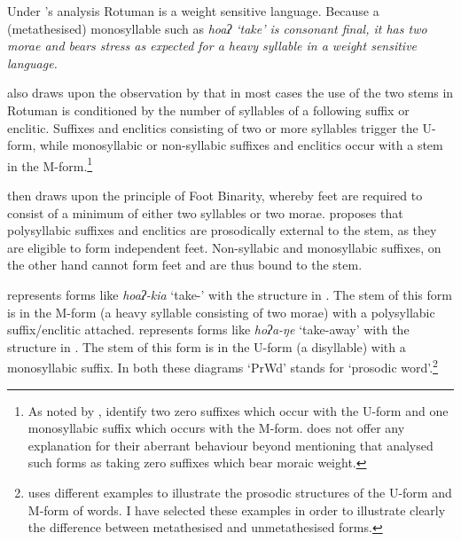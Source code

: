 Under \citeauthor{mcc00}'s analysis Rotuman is a weight sensitive language.
Because a (metathesised) monosyllable such as \it{hoaʔ} `take' is
consonant final, it has two morae and bears stress
as expected for a heavy syllable in a weight sensitive language.

\cite{mcc00} also draws upon the observation
by \cite{haki98} that in most cases the use of the two stems in Rotuman
is conditioned by the number of syllables of a following suffix or enclitic.
Suffixes and enclitics consisting of two or more syllables trigger the U-form,
while monosyllabic or non-syllabic suffixes and enclitics occur
with a stem in the M-form.\footnote{\label{fn:Problem2}
		As noted by \cite[162]{mcc00}, \citet{haki98} identify
		two zero suffixes which occur with the U-form
		and one monosyllabic suffix which occurs with the M-form.
		\cite{mcc00} does not offer any explanation for their
		aberrant behaviour beyond mentioning that \citet{haki98} analysed such
		forms as taking zero suffixes which bear moraic weight.}

\citet[156]{mcc00} then draws upon the principle of Foot Binarity,
whereby feet are required to consist of a minimum of either two syllables or two morae.
\citeauthor{mcc00} proposes that polysyllabic suffixes and enclitics
are prosodically external to the stem, as they are eligible to form independent feet.
Non-syllabic and monosyllabic suffixes, on the other hand cannot form feet and are thus bound to the stem.

\citet[163]{mcc00} represents forms like \emph{hoaʔ-kia}
`take-' with the structure in .
The stem of this form is in the M-form
(a heavy syllable consisting of two morae)
with a polysyllabic suffix/enclitic attached.
\citeauthor{mcc00} represents forms like \emph{hoʔa-ŋe} `take-away'
with the structure in .
The stem of this form is in the U-form (a disyllable) with a monosyllabic suffix.
In both these diagrams `PrWd' stands for `prosodic word'.\footnote{
		\cite{mcc00} uses different examples to illustrate the prosodic
		structures of the U-form and M-form of words.
		I have selected these examples in order to illustrate
		clearly the difference between metathesised and unmetathesised forms.}

